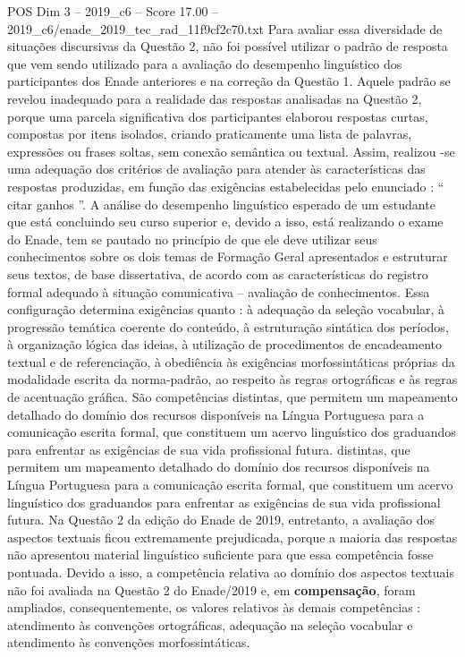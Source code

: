 \begin{textsample}{POS Dim 3 – 2019\_c6 – Score 17.00 – 2019\_c6/enade\_2019\_tec\_rad\_11f9cf2c70.txt}
Para avaliar essa diversidade de situações discursivas da Questão 2, não foi possível utilizar o padrão de resposta que vem sendo utilizado para a avaliação do desempenho linguístico dos participantes dos Enade anteriores e na correção da Questão 1.
Aquele padrão se revelou inadequado para a realidade das respostas analisadas na Questão 2, porque uma parcela significativa dos participantes elaborou respostas curtas, compostas por itens isolados, criando praticamente uma lista de palavras, expressões ou frases soltas, sem conexão semântica ou textual.
Assim, realizou -se uma adequação dos critérios de avaliação para atender às características das respostas produzidas, em função das exigências estabelecidas pelo enunciado : “ citar ganhos ”.
A análise do desempenho linguístico esperado de um estudante que está concluindo seu curso superior e, devido a isso, está realizando o exame do Enade, tem se pautado no princípio de que ele deve utilizar seus conhecimentos sobre os dois temas de Formação Geral apresentados e estruturar seus textos, de base dissertativa, de acordo com as características do registro formal adequado à situação comunicativa – avaliação de conhecimentos.
Essa configuração determina exigências quanto : à adequação da seleção vocabular, à progressão temática coerente do conteúdo, à estruturação sintática dos períodos, à organização lógica das ideias, à utilização de procedimentos de encadeamento textual e de referenciação, à obediência às exigências morfossintáticas próprias da modalidade escrita da norma-padrão, ao respeito às regras ortográficas e às regras de acentuação gráfica.
São competências distintas, que permitem um mapeamento detalhado do domínio dos recursos disponíveis na Língua Portuguesa para a comunicação escrita formal, que constituem um acervo linguístico dos graduandos para enfrentar as exigências de sua vida profissional futura. distintas, que permitem um mapeamento detalhado do domínio dos recursos disponíveis na Língua Portuguesa para a comunicação escrita formal, que constituem um acervo linguístico dos graduandos para enfrentar as exigências de sua vida profissional futura.
Na Questão 2 da edição do Enade de 2019, entretanto, a avaliação dos aspectos textuais ficou extremamente prejudicada, porque a maioria das respostas não apresentou material linguístico suficiente para que essa competência fosse pontuada.
Devido a isso, a competência relativa ao domínio dos aspectos textuais não foi avaliada na Questão 2 do Enade/2019 e, em \textbf{compensação}, foram ampliados, consequentemente, os valores relativos às demais competências : atendimento às convenções ortográficas, adequação na seleção vocabular e atendimento às convenções morfossintáticas.

\end{textsample}

